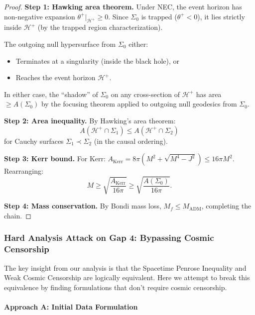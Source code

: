 \begin{proof}
\textbf{Step 1: Hawking area theorem.}
Under NEC, the event horizon has non-negative expansion $\theta^+|_{\mathcal{H}^+} \geq 0$. Since $\Sigma_0$ is trapped ($\theta^+ < 0$), it lies strictly inside $\mathcal{H}^+$ (by the trapped region characterization).

The outgoing null hypersurface from $\Sigma_0$ either:
\begin{itemize}
    \item Terminates at a singularity (inside the black hole), or
    \item Reaches the event horizon $\mathcal{H}^+$.
\end{itemize}

In either case, the ``shadow'' of $\Sigma_0$ on any cross-section of $\mathcal{H}^+$ has area $\geq A(\Sigma_0)$ by the focusing theorem applied to outgoing null geodesics from $\Sigma_0$.

\textbf{Step 2: Area inequality.}
By Hawking's area theorem:
\begin{equation}
    A(\mathcal{H}^+ \cap \Sigma_1) \leq A(\mathcal{H}^+ \cap \Sigma_2)
\end{equation}
for Cauchy surfaces $\Sigma_1 \prec \Sigma_2$ (in the causal ordering).

\textbf{Step 3: Kerr bound.}
For Kerr: $A_{\text{Kerr}} = 8\pi(M^2 + \sqrt{M^4 - J^2}) \leq 16\pi M^2$. Rearranging:
\begin{equation}
    M \geq \sqrt{\frac{A_{\text{Kerr}}}{16\pi}} \geq \sqrt{\frac{A(\Sigma_0)}{16\pi}}.
\end{equation}

\textbf{Step 4: Mass conservation.}
By Bondi mass loss, $M_f \leq M_{\mathrm{ADM}}$, completing the chain.
\end{proof}

\subsubsection{Hard Analysis Attack on Gap 4: Bypassing Cosmic Censorship}\label{subsec:HardGap4}

The key insight from our analysis is that the Spacetime Penrose Inequality and Weak Cosmic Censorship are logically equivalent. Here we attempt to break this equivalence by finding formulations that don't require cosmic censorship.

\paragraph{Approach A: Initial Data Formulation}


